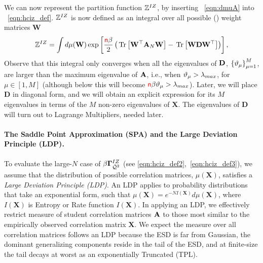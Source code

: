 We can now represent the partition function
$\mathbb{Z}^{IZ}$, by inserting \EQN~\ref{eqn:dmuA} into \EQN~\ref{eqn:hciz_def}.
$\mathbb{Z}^{IZ}$ is now defined as an integral over all
possible (\Teacher) weight matrices $\mathbf{W}$
\begin{equation}
  \label{eqn:ZD0}
    \mathbb{Z}^{IZ}=\int d\mu(\mathbf{W})\exp\left[\frac{{\color{red}\sf{n}}\beta}{2}\left
    (\mbox{}\operatorname{Tr}\left[\mathbf{W}^{\top}\mathbf{A}_N\mathbf{W}\right]-\mbox{}\operatorname{Tr}\left[\mathbf{W}\mathbf{D}\mathbf{W}^{\top}\right]  
    \right)\right]  ,
\end{equation}
Observe that this integral only converges when all the eigenvalues of $\mathbf{D}$, 
$\left\{ \vartheta_{\mu} \right\}_{\mu=1}^{M}$, 
are larger than the maximum eigenvalue of $\mathbf{\mathbf{A}}$, i.e., when $\vartheta_{\mu} >\lambda_{max}$, for $\mu\in[1,M]$
(although below this will become ${\color{red}\sf{n}}\beta\vartheta_{\mu} >\lambda_{max}$).
Later, we will place $\mathbf{D}$ in diagonal form, and we will obtain an explicit expression for its $M$ eigenvalues in terms of the $M$ non-zero eigenvalues of $\mathbf{X}$.
The eigenvalues of $\mathbf{D}$ will turn out to Lagrange Multipliers, needed later.


\paragraph{The Saddle Point Approximation (SPA) and the Large Deviation Principle (LDP).}

To evaluate the large-$N$ case of $\beta\mathbf{\Gamma}^{IZ}_{\bar{\mathcal{Q}}^{2}}$ (see \ref{eqn:hciz_def2},~\ref{eqn:hciz_def3}), 
we assume that the distribution of possible \Teacher correlation matrices,
$\mu(\mathbf{X})$, satisfies a \emph{Large Deviation Principle (LDP)}.
An LDP applies to probability distributions that take an exponential form,
such that $\mu(\mathbf{X})=e^{-N I(\mathbf{X})}d\mu(\mathbf{X})$,
where  $I(\mathbf{X})$ is Entropy or Rate function $I(\mathbf{X})$.
In applying an LDP, we effectively restrict measure of student correlation matrices $\mathbf{\mathbf{A}}$
to those most similar to the empirically observed \Teacher correlation matrix $\mathbf{X}$.
%
We expect the measure over all \Teacher correlation matrices
follows an LDP because the ESD is far from Gaussian,
the dominant generalizing components reside in the tail of the ESD,
and at finite-size the tail decays at worst as an exponentially
Truncated \PowerLaw (TPL).

